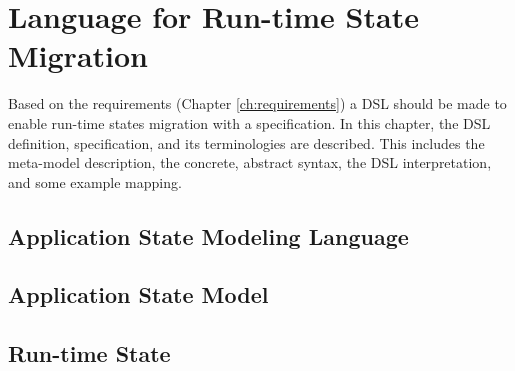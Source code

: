 \chapter{Language for Run-time State Migration}
\label{ch:language}
Based on the requirements (Chapter \ref{ch:requirements}) a DSL should be made to enable run-time states migration with a specification.
In this chapter, the DSL definition, specification, and its terminologies are described. This includes the meta-model description, the concrete, abstract syntax, the DSL interpretation, and some example mapping.


\section{Application State Modeling Language}


\section{Application State Model}


\section{Run-time State}
